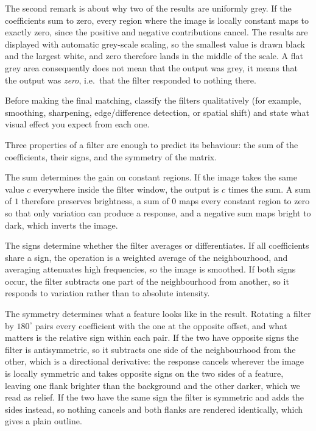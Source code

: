 \documentclass[11pt]{article}
\begin{document}
The second remark is about why two of the results are uniformly grey. If the
coefficients sum to zero, every region where the image is locally constant
maps to exactly zero, since the positive and negative contributions cancel.
The results are displayed with automatic grey-scale scaling, so the smallest
value is drawn black and the largest white, and zero therefore lands in the
middle of the scale. A flat grey area consequently does not mean that the
output was grey, it means that the output was \emph{zero}, i.e.\ that the
filter responded to nothing there.

\begin{question}
Before making the final matching, classify the filters qualitatively (for
example, smoothing, sharpening, edge/difference detection, or spatial shift)
and state what visual effect you expect from each one.
\end{question}

Three properties of a filter are enough to predict its behaviour: the sum of
the coefficients, their signs, and the symmetry of the matrix.

The sum determines the gain on constant regions. If the image takes the same
value $c$ everywhere inside the filter window, the output is $c$ times the
sum. A sum of $1$ therefore preserves brightness, a sum of $0$ maps every
constant region to zero so that only variation can produce a response, and a
negative sum maps bright to dark, which inverts the image.

The signs determine whether the filter averages or differentiates. If all
coefficients share a sign, the operation is a weighted average of the
neighbourhood, and averaging attenuates high frequencies, so the image is
smoothed. If both signs occur, the filter subtracts one part of the
neighbourhood from another, so it responds to variation rather than to
absolute intensity.

The symmetry determines what a feature looks like in the result. Rotating a
filter by $180^\circ$ pairs every coefficient with the one at the opposite
offset, and what matters is the relative sign within each pair. If the two
have opposite signs the filter is antisymmetric, so it subtracts one side of
the neighbourhood from the other, which is a directional derivative: the
response cancels wherever the image is locally symmetric and takes opposite
signs on the two sides of a feature, leaving one flank brighter than the
background and the other darker, which we read as relief. If the two have the
same sign the filter is symmetric and adds the sides instead, so nothing
cancels and both flanks are rendered identically, which gives a plain outline.
\end{document}
